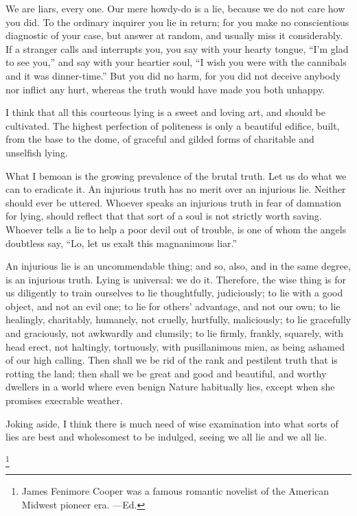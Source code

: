 \documentclass{novelette} %
\begin{document}
We are liars, every one. Our mere {howdy-do}
is a lie, because we do not care how you did.
To the ordinary inquirer you lie in return; for you make
no conscientious diagnostic of your case, but answer at random, and
usually miss it considerably. If a stranger calls and interrupts
you, you say with your hearty tongue, ``I'm glad to see you,'' and say
with your heartier soul, ``I wish you were with the cannibals and it was
dinner-time.'' But you did no harm, for you did not
deceive anybody nor inflict any hurt, whereas the truth would have made
you both unhappy.

I think that all this courteous lying is a sweet and loving art, and
should be cultivated. The highest perfection of politeness is only a
beautiful edifice, built, from the base to the dome, of graceful and
gilded forms of charitable and unselfish lying.

What I bemoan is the growing prevalence of the brutal truth. Let us do
what we can to eradicate it. An injurious truth has no merit over an
injurious lie. Neither should ever be uttered. Whoever speaks an
injurious truth in fear of damnation for lying, should
reflect that that sort of a soul is not strictly worth saving.
Whoever tells a lie to help a poor devil out of trouble, is one of whom the
angels doubtless say, ``Lo, let us exalt this magnanimous liar.''

An injurious lie is an uncommendable thing; and so, also, and in the same
degree, is an injurious truth. Lying is universal: we  do it.
Therefore, the wise thing is for us
diligently to train ourselves to lie thoughtfully, judiciously; to lie
with a good object, and not an evil one; to lie for others' advantage,
and not our own; to lie healingly, charitably, humanely, not cruelly,
hurtfully, maliciously; to lie gracefully and graciously, not awkwardly
and clumsily; to lie firmly, frankly, squarely, with head erect, not
haltingly, tortuously, with pusillanimous mien, as being ashamed of our
high calling. Then shall we be rid of the rank and pestilent truth that
is rotting the land; then shall we be great and good and beautiful, and
worthy dwellers in a world where even benign Nature habitually lies,
except when she promises execrable weather.

Joking aside, I think there is much need of wise examination into what
sorts of lies are best and wholesomest to be indulged, seeing we 
all lie and we  all lie.




\begin{opening}
\null\null\null\null\null\null
{}
\null
{}
\footnote{James Fenimore Cooper was
a famous romantic novelist of the American Midwest pioneer era. —Ed.}

\null\null\null\null
\end{opening}
\end{document}
